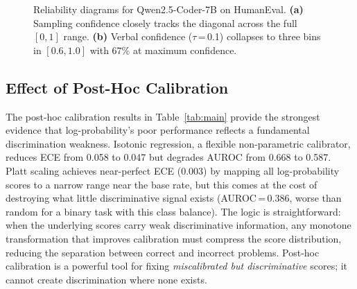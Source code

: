 \documentclass{article}
\begin{document}
\begin{figure}[t]
\caption{Reliability diagrams for Qwen2.5-Coder-7B on HumanEval. \textbf{(a)} Sampling confidence closely tracks the diagonal across the full $[0,1]$ range. \textbf{(b)} Verbal confidence ($\tau$\,=\,0.1) collapses to three bins in $[0.6, 1.0]$ with 67\% at maximum confidence.}
\label{fig:reliability}
\vspace{-0.5em}
\end{figure}

\subsection{Effect of Post-Hoc Calibration}
\label{sec:posthoc}

The post-hoc calibration results in Table~\ref{tab:main} provide the strongest evidence that log-probability's poor performance reflects a fundamental discrimination weakness. Isotonic regression, a flexible non-parametric calibrator, reduces ECE from 0.058 to 0.047 but degrades AUROC from 0.668 to 0.587. Platt scaling achieves near-perfect ECE (0.003) by mapping all log-probability scores to a narrow range near the base rate, but this comes at the cost of destroying what little discriminative signal exists (AUROC\,=\,0.386, worse than random for a binary task with this class balance). The logic is straightforward: when the underlying scores carry weak discriminative information, any monotone transformation that improves calibration must compress the score distribution, reducing the separation between correct and incorrect problems. Post-hoc calibration is a powerful tool for fixing \emph{miscalibrated but discriminative} scores; it cannot create discrimination where none exists.
\end{document}
